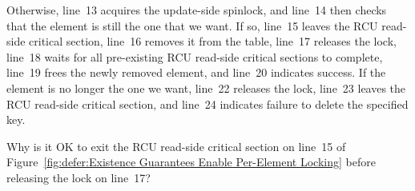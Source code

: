 Otherwise, line~13 acquires the update-side spinlock, and
line~14 then checks that the element is still the one that we want.
If so, line~15 leaves the RCU read-side critical section,
line~16 removes it from the table, line~17 releases
the lock, line~18 waits for all pre-existing RCU read-side critical
sections to complete, line~19 frees the newly removed element,
and line~20 indicates success.
If the element is no longer the one we want, line~22 releases
the lock, line~23 leaves the RCU read-side critical section,
and line~24 indicates failure to delete the specified key.

\QuickQuiz{}
	Why is it OK to exit the RCU read-side critical section on
	line~15 of
	Figure~\ref{fig:defer:Existence Guarantees Enable Per-Element Locking}
	before releasing the lock on line~17?
 \QuickQuizEnd

